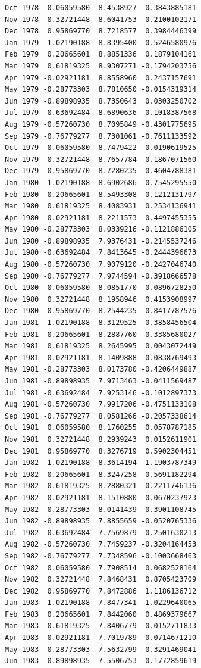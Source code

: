 \documentclass[
  11pt,
  a4paper,
]{report}
\begin{document}
\begin{verbatim}
Oct 1978  0.06059580  8.4538927 -0.3843885181
Nov 1978  0.32721448  8.6041753  0.2100102171
Dec 1978  0.95869770  8.7218577  0.3984446399
Jan 1979  1.02190188  8.8395400  0.5246580976
Feb 1979  0.20665601  8.8851336  0.1879104161
Mar 1979  0.61819325  8.9307271 -0.1794203756
Apr 1979 -0.02921181  8.8558960  0.2437157691
May 1979 -0.28773303  8.7810650 -0.0154319314
Jun 1979 -0.89898935  8.7350643  0.0303250702
Jul 1979 -0.63692484  8.6890636 -0.1018387568
Aug 1979 -0.57260730  8.7095849 -0.4301775695
Sep 1979 -0.76779277  8.7301061 -0.7611133592
Oct 1979  0.06059580  8.7479422  0.0190619525
Nov 1979  0.32721448  8.7657784  0.1867071560
Dec 1979  0.95869770  8.7280235  0.4604788381
Jan 1980  1.02190188  8.6902686  0.7545295550
Feb 1980  0.20665601  8.5493308  0.1212131797
Mar 1980  0.61819325  8.4083931  0.2534136941
Apr 1980 -0.02921181  8.2211573 -0.4497455355
May 1980 -0.28773303  8.0339216 -0.1121886105
Jun 1980 -0.89898935  7.9376431 -0.2145537246
Jul 1980 -0.63692484  7.8413645 -0.2444396673
Aug 1980 -0.57260730  7.9079120 -0.2427046740
Sep 1980 -0.76779277  7.9744594 -0.3918666578
Oct 1980  0.06059580  8.0851770 -0.0896728250
Nov 1980  0.32721448  8.1958946  0.4153908997
Dec 1980  0.95869770  8.2544235  0.8417787576
Jan 1981  1.02190188  8.3129525  0.3858456504
Feb 1981  0.20665601  8.2887760  0.3385680027
Mar 1981  0.61819325  8.2645995  0.0043072449
Apr 1981 -0.02921181  8.1409888 -0.0838769493
May 1981 -0.28773303  8.0173780 -0.4206449887
Jun 1981 -0.89898935  7.9713463 -0.0411569487
Jul 1981 -0.63692484  7.9253146 -0.1012897373
Aug 1981 -0.57260730  7.9917206 -0.4751133108
Sep 1981 -0.76779277  8.0581266 -0.2057338614
Oct 1981  0.06059580  8.1760255  0.0578787185
Nov 1981  0.32721448  8.2939243  0.0152611901
Dec 1981  0.95869770  8.3276719  0.5902304451
Jan 1982  1.02190188  8.3614194  1.1903787349
Feb 1982  0.20665601  8.3247258  0.5691182294
Mar 1982  0.61819325  8.2880321  0.2211746136
Apr 1982 -0.02921181  8.1510880  0.0670237923
May 1982 -0.28773303  8.0141439 -0.3901108745
Jun 1982 -0.89898935  7.8855659 -0.0520765336
Jul 1982 -0.63692484  7.7569879 -0.2501630213
Aug 1982 -0.57260730  7.7459237 -0.3204164453
Sep 1982 -0.76779277  7.7348596 -0.1003668463
Oct 1982  0.06059580  7.7908514  0.0682528164
Nov 1982  0.32721448  7.8468431  0.8705423709
Dec 1982  0.95869770  7.8472886  1.1186136712
Jan 1983  1.02190188  7.8477341  1.0229640065
Feb 1983  0.20665601  7.8442060  0.4869379667
Mar 1983  0.61819325  7.8406779 -0.0152711833
Apr 1983 -0.02921181  7.7019789 -0.0714671210
May 1983 -0.28773303  7.5632799 -0.3291469041
Jun 1983 -0.89898935  7.5506753 -0.1772859619

\end{verbatim}
\end{document}
